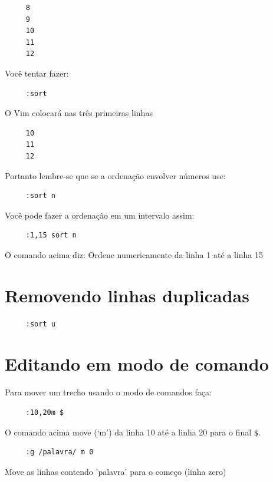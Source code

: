 \documentclass[10pt,a4paper,openany]{book}
\begin{document}
\begin{verbatim}
     8
     9
     10
     11
     12
\end{verbatim}

Você tentar fazer:

\begin{verbatim}
     :sort
\end{verbatim}

O Vim colocará nas três primeiras linhas

\begin{verbatim}
     10
     11
     12
\end{verbatim}

Portanto lembre-se que se a ordenação envolver números use:

\begin{verbatim}
     :sort n
\end{verbatim}

Você pode fazer a ordenação em um intervalo assim:

\begin{verbatim}
     :1,15 sort n
\end{verbatim}

O comando acima diz: Ordene numericamente da linha 1 até a linha 15

\section{Removendo linhas duplicadas}

\begin{verbatim}
     :sort u
\end{verbatim}


\section{Editando em modo de comando}\label{sec:Editando em modo de comando}

Para mover um trecho usando o modo de comandos faça:

\begin{verbatim}
     :10,20m $
\end{verbatim}

O comando acima move (`m') da linha 10 até a linha 20 para o final \verb|$|.

\begin{verbatim}
     :g /palavra/ m 0
\end{verbatim}

Move as linhas contendo 'palavra' para o começo (linha zero)
\end{document}
